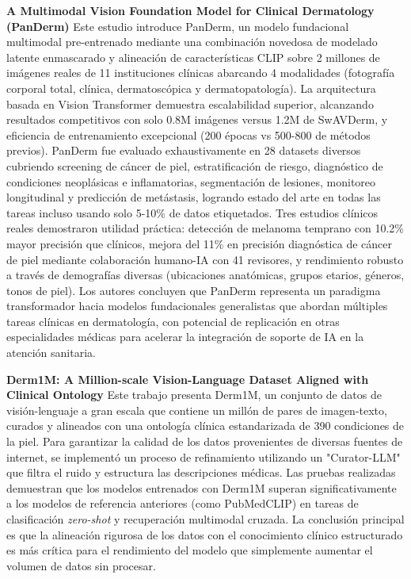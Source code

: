 \documentclass[11pt, a4paper]{article}
\begin{document}
\textbf{A Multimodal Vision Foundation Model for Clinical Dermatology (PanDerm)} \cite{yan_multimodal_2025}
Este estudio introduce PanDerm, un modelo fundacional multimodal pre-entrenado mediante una combinación novedosa de modelado latente enmascarado y alineación de características CLIP sobre 2 millones de imágenes reales de 11 instituciones
clínicas abarcando 4 modalidades (fotografía corporal total, clínica, dermatoscópica y dermatopatología). La arquitectura basada en Vision Transformer demuestra escalabilidad superior, alcanzando resultados competitivos con solo 0.8M
imágenes versus 1.2M de SwAVDerm, y eficiencia de entrenamiento excepcional (200 épocas vs 500-800 de métodos previos). PanDerm fue evaluado exhaustivamente en 28 datasets diversos cubriendo screening de cáncer de piel, estratificación de
riesgo, diagnóstico de condiciones neoplásicas e inflamatorias, segmentación de lesiones, monitoreo longitudinal y predicción de metástasis, logrando estado del arte en todas las tareas incluso usando solo 5-10\% de datos etiquetados. Tres
estudios clínicos reales demostraron utilidad práctica: detección de melanoma temprano con 10.2\% mayor precisión que clínicos, mejora del 11\% en precisión diagnóstica de cáncer de piel mediante colaboración humano-IA con 41 revisores, y
rendimiento robusto a través de demografías diversas (ubicaciones anatómicas, grupos etarios, géneros, tonos de piel). Los autores concluyen que PanDerm representa un paradigma transformador hacia modelos fundacionales generalistas que abordan
múltiples tareas clínicas en dermatología, con potencial de replicación en otras especialidades médicas para acelerar la integración de soporte de IA en la atención sanitaria.

\textbf{Derm1M: A Million-scale Vision-Language Dataset Aligned with Clinical Ontology} \cite{yan_derm1m_2025}
Este trabajo presenta Derm1M, un conjunto de datos de visión-lenguaje a gran escala que contiene un millón de pares de imagen-texto, curados y alineados con una ontología clínica estandarizada de 390
condiciones de la piel. Para garantizar la calidad de los datos provenientes de diversas fuentes de internet, se implementó un proceso de refinamiento utilizando un "Curator-LLM" que filtra el ruido y
estructura las descripciones médicas. Las pruebas realizadas demuestran que los modelos entrenados con Derm1M superan significativamente a los modelos de referencia anteriores (como PubMedCLIP) en tareas
de clasificación \textit{zero-shot} y recuperación multimodal cruzada. La conclusión principal es que la alineación rigurosa de los datos con el conocimiento clínico estructurado es más crítica para el
rendimiento del modelo que simplemente aumentar el volumen de datos sin procesar.
\end{document}
